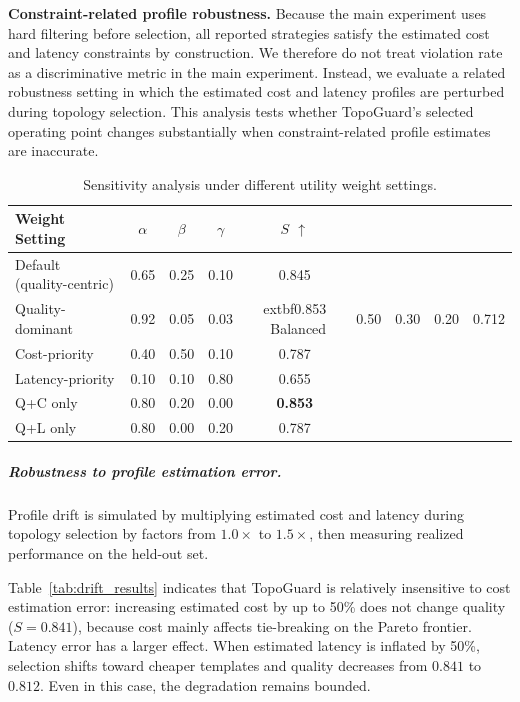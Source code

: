\documentclass[manuscript,review,anonymous]{acmart}
\begin{document}
\textbf{Constraint-related profile robustness.} Because the main experiment uses hard filtering before selection, all reported strategies satisfy the estimated cost and latency constraints by construction. We therefore do not treat violation rate as a discriminative metric in the main experiment. Instead, we evaluate a related robustness setting in which the estimated cost and latency profiles are perturbed during topology selection. This analysis tests whether TopoGuard's selected operating point changes substantially when constraint-related profile estimates are inaccurate.

\begin{table}[t]
\centering
\caption{Sensitivity analysis under different utility weight settings.}
\label{tab:sensitivity_simple}
\small
\begin{tabular}{lcccc}
\toprule
\textbf{Weight Setting} & $\alpha$ & $\beta$ & $\gamma$ & \textbf{$S$ $\uparrow$} \\
\midrule
Default (quality-centric) & 0.65 & 0.25 & 0.10 & 0.845 \\
Quality-dominant            & 0.92 & 0.05 & 0.03 & 	extbf{0.853} \
Balanced                   & 0.50 & 0.30 & 0.20 & 0.712 \\
Cost-priority               & 0.40 & 0.50 & 0.10 & 0.787 \\
Latency-priority           & 0.10 & 0.10 & 0.80 & 0.655 \\
Q+C only                    & 0.80 & 0.20 & 0.00 & \textbf{0.853} \\
Q+L only                    & 0.80 & 0.00 & 0.20 & 0.787 \\
\bottomrule
\end{tabular}
\end{table}

\subparagraph{Robustness to profile estimation error.}
Profile drift is simulated by multiplying estimated cost and latency during topology selection by factors from $1.0\times$ to $1.5\times$, then measuring realized performance on the held-out set.

Table~\ref{tab:drift_results} indicates that TopoGuard is relatively insensitive to cost estimation error: increasing estimated cost by up to 50\% does not change quality ($S=0.841$), because cost mainly affects tie-breaking on the Pareto frontier. Latency error has a larger effect. When estimated latency is inflated by 50\%, selection shifts toward cheaper templates and quality decreases from $0.841$ to $0.812$. Even in this case, the degradation remains bounded.
\end{document}
